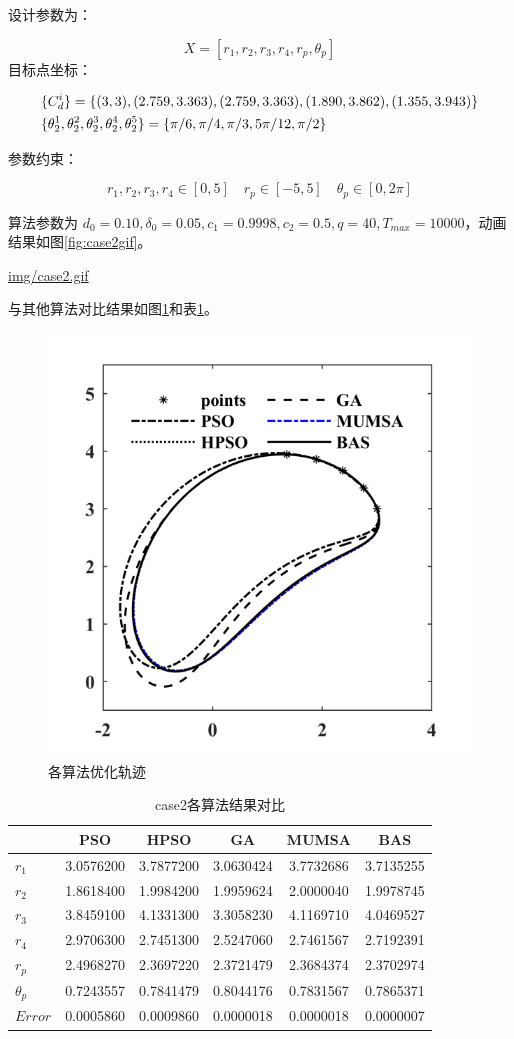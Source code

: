 \documentclass[]{ctexbook}
\begin{document}
设计参数为：

\[
X = [r_1,r_2,r_3,r_4,r_p,\theta_p]
\] 目标点坐标：

\begin{align}
&\{C_d^i\} = \{(3,3),(2.759,3.363),(2.759,3.363),(1.890,3.862),(1.355,3.943)\} \notag \\
&\{\theta_2^1,\theta_2^2,\theta_2^3,\theta_2^4,\theta_2^5\}=\{\pi/6,\pi/4,\pi/3,5\pi/12,\pi/2\} \notag \\
\end{align}

参数约束：

\[
r_1,r_2,r_3,r_4\in[0,5]\quad r_p\in[-5,5]\quad \theta_p\in[0,2\pi]
\]

算法参数为
\(d_0 = 0.10,\delta_0=0.05,c_1=0.9998,c_2=0.5,q=40,T_{max}=10000\)，动画结果如图\ref{fig:case2gif}。

\url{img/case2.gif}

与其他算法对比结果如图\ref{fig:case2png}和表\ref{tab:case2table}。

\begin{figure}

{\centering \includegraphics[width=0.5\linewidth]{img/case2png} 

}

\caption{各算法优化轨迹}\label{fig:case2png}
\end{figure}

\begin{table}[t]

\caption{\label{tab:case2table}case2各算法结果对比}
\centering
\begin{tabular}{lccccc}
\toprule
  & PSO & HPSO & GA & MUMSA & BAS\\
\midrule
$r_1$ & 3.0576200 & 3.7877200 & 3.0630424 & 3.7732686 & 3.7135255\\
$r_2$ & 1.8618400 & 1.9984200 & 1.9959624 & 2.0000040 & 1.9978745\\
$r_3$ & 3.8459100 & 4.1331300 & 3.3058230 & 4.1169710 & 4.0469527\\
$r_4$ & 2.9706300 & 2.7451300 & 2.5247060 & 2.7461567 & 2.7192391\\
$r_p$ & 2.4968270 & 2.3697220 & 2.3721479 & 2.3684374 & 2.3702974\\
\addlinespace
$\theta_p$ & 0.7243557 & 0.7841479 & 0.8044176 & 0.7831567 & 0.7865371\\
$Error$ & 0.0005860 & 0.0009860 & 0.0000018 & 0.0000018 & 0.0000007\\
\bottomrule
\end{tabular}
\end{table}
\end{document}
